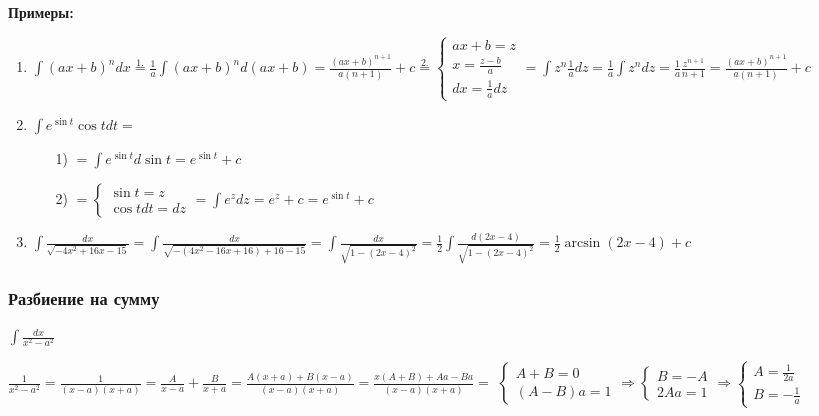 \documentclass{article}
\begin{document}
    \textbf{Примеры:}
    \begin{enumerate}
        \item \(\int (ax + b)^n dx \overset{1.} = \frac{1}{a}\int (ax + b)^n d(ax+b) = \frac{(ax+b)^{n+1}}{a(n+1)} + c \overset{2.}{=} \begin{cases}
            ax + b = z\\
            x = \frac{z-b}{a}\\
            dx = \frac{1}{a}dz
        \end{cases} = \int z^n \frac{1}{a} dz = \frac{1}{a}\int z^n dz = \frac{1}{a}\frac{z^{n+1}}{n+1} = \frac{(ax+b)^{n+1}}{a(n+1)} + c\)

        \item \(\int e^{\sin t} \cos tdt = \)
        \begin{enumerate}
            \item[1)] \(= \int e^{\sin t} d\sin t = e^{\sin t} + c\)
            \item[2)] \(= \begin{cases}
                \sin t = z\\
                \cos t dt = dz
            \end{cases} = \int e^z dz = e^z + c = e^{\sin t} + c\)
        \end{enumerate}
        \item \(\int \frac{dx}{\sqrt{-4x^2+16x-15}} = \int \frac{dx}{\sqrt{-(4x^2-16x+16)+16-15}} = \int \frac{dx}{\sqrt{1-(2x-4)^2}} = \frac{1}{2}\int \frac{d(2x-4)}{\sqrt{1 - (2x-4)^2}} = \frac{1}{2}\arcsin(2x-4)+c\)
    \end{enumerate}

    \subsubsection{Разбиение на сумму}
    
    \(\int \frac{dx}{x^2 - a^2} \)

    \(\frac{1}{x^2 - a^2} = \frac{1}{(x-a)(x+a)} = \frac{A}{x-a} + \frac{B}{x+a} = \frac{A(x+a) + B(x-a)}{(x-a)(x+a)} = \frac{x(A+B) + Aa - Ba}{(x-a)(x+a)} = \)
    \(\begin{cases}
        A + B = 0\\
        (A - B)a = 1
    \end{cases}\Rightarrow
    \begin{cases}
        B = -A\\
        2Aa = 1
    \end{cases} \Rightarrow
    \begin{cases}
        A = \frac{1}{2a}\\
        B = -\frac{1}{a}
    \end{cases}\)
\end{document}
